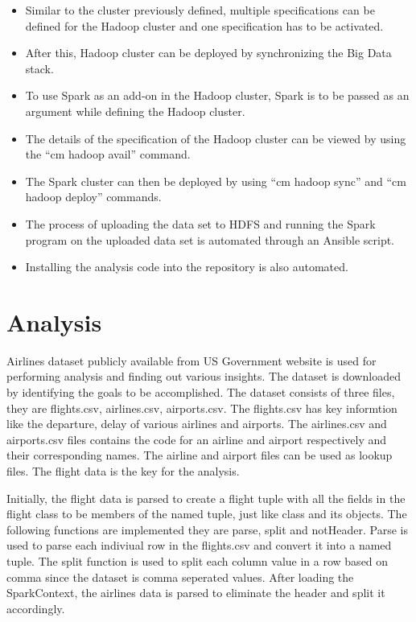 \documentclass[9pt,twocolumn,twoside]{../../styles/osajnl}
\begin{document}
\begin{itemize}
  
\item Similar to the cluster previously defined, multiple
  specifications can be defined for the Hadoop cluster and one
  specification has to be activated.

\item After this, Hadoop cluster can be deployed by synchronizing the
  Big Data stack.

\item To use Spark as an add-on in the Hadoop cluster, Spark is to be
  passed as an argument while defining the Hadoop cluster.

\item The details of the specification of the Hadoop cluster can be
  viewed by using the “cm hadoop avail” command.

\item The Spark cluster can then be deployed by using “cm hadoop sync”
  and “cm hadoop deploy” commands.

\item The process of uploading the data set to HDFS and running the
  Spark program on the uploaded data set is automated through an
  Ansible script.

\item Installing the analysis code into the repository is also automated.
\end{itemize}

\section{Analysis}

Airlines dataset publicly available from US Government website is used
for performing analysis and finding out various insights. The dataset
is downloaded by identifying the goals to be accomplished. The dataset
consists of three files, they are flights.csv, airlines.csv,
airports.csv.  The flights.csv has key informtion like the departure,
delay of various airlines and airports. The airlines.csv and
airports.csv files contains the code for an airline and airport
respectively and their corresponding names.  The airline and airport
files can be used as lookup files. The flight data is the key for the analysis.

Initially, the flight data is parsed to create a flight tuple with all
the fields in the flight class to be members of the named tuple, just
like class and its objects. The following functions are implemented
they are parse, split and notHeader. Parse is used to parse each
indiviual row in the flights.csv and convert it into a named
tuple. The split function is used to split each column value in a row
based on comma since the dataset is comma seperated values. After
loading the SparkContext, the airlines data is parsed to eliminate the
header and split it accordingly.
\end{document}
